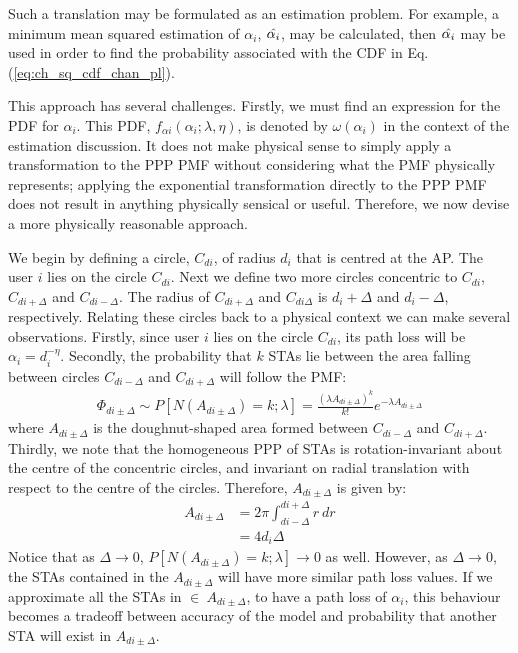Such a translation may be formulated as an estimation problem. For example, a minimum mean squared estimation of $\alpha_i$, $\Hat{\alpha_i}$, may be calculated, then $\Hat{\alpha_i}$ may be used in order to find the probability associated with the CDF in Eq. (\ref{eq:ch_sq_cdf_chan_pl}).

This approach has several challenges. Firstly, we must find an expression for the PDF for $\alpha_i$. This PDF, $f_{\alpha i}(\alpha_i;\lambda,\eta)$, is denoted by $\omega(\alpha_i)$ in the context of the estimation discussion. It does not make physical sense to simply apply a transformation to the PPP PMF without considering what the PMF physically represents; applying the exponential transformation directly to the PPP PMF does not result in anything physically sensical or useful. Therefore, we now devise a more physically reasonable approach.

We begin by defining a circle, $C_{di}$, of radius $d_i$ that is centred at the AP. The user $i$ lies on the circle $C_{di}$. Next we define two more circles concentric to $C_{di}$, $C_{di+\Delta}$ and $C_{di-\Delta}$. The radius of $C_{di+\Delta}$ and $C_{di\Delta}$ is $d_i + \Delta$ and $d_i - \Delta$, respectively. Relating these circles back to a physical context we can make several observations. Firstly, since user $i$ lies on the circle $C_{di}$, its path loss will be $\alpha_i = d_i^{-\eta}$.  Secondly, the probability that $k$ STAs lie between the area falling between circles $C_{di-\Delta}$ and $C_{di+\Delta}$ will follow the PMF:
\begin{equation}\label{eq:ppp_pmf_circle}
    \begin{aligned}
        \Phi_{di\pm\Delta} \sim P[N(A_{di\pm\Delta})=k;\lambda] = \frac{(\lambda A_{di\pm\Delta})^k}{k!}e^{-\lambda A_{di\pm\Delta}}
    \end{aligned}
\end{equation}
where $A_{di\pm\Delta}$ is the doughnut-shaped area formed between $C_{di-\Delta}$ and $C_{di+\Delta}$. Thirdly, we note that the homogeneous PPP of STAs is rotation-invariant about the centre of the concentric circles, and invariant on radial translation with respect to the centre of the circles. Therefore, $A_{di\pm\Delta}$ is given by:
\begin{equation}\label{eq:disk_area}
    \begin{aligned}
        A_{di\pm\Delta} &= 2\pi\int_{di-\Delta}^{di+\Delta}r\ dr\\
        &= 4d_i\Delta
    \end{aligned}
\end{equation}
Notice that as $\Delta \rightarrow 0$, $P[N(A_{di\pm\Delta})=k;\lambda] \rightarrow 0$ as well. However, as $\Delta \rightarrow 0$, the STAs contained in the $A_{di\pm\Delta}$ will have more similar path loss values. If we approximate all the STAs in $\in\ A_{di\pm\Delta}$, to have a path loss of $\alpha_i$, this behaviour becomes a tradeoff between accuracy of the model and probability that another STA will exist in $A_{di\pm\Delta}$.

